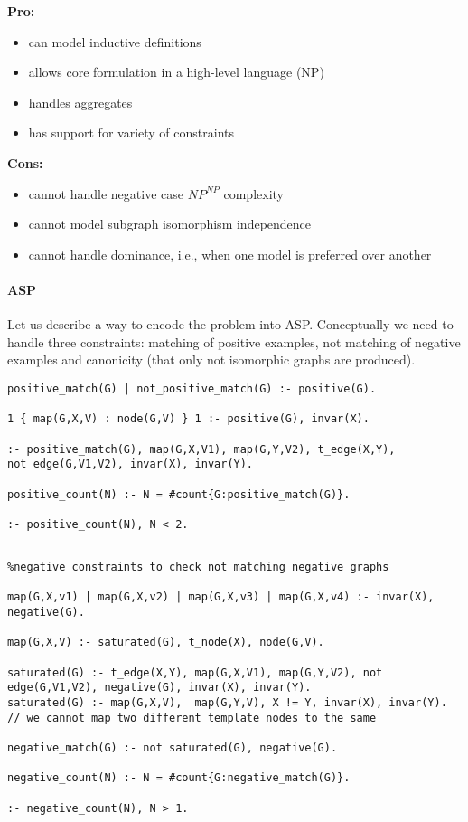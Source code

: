 \documentclass{article}
\theoremstyle{definition}
\begin{document}
\textbf{Pro:}
\begin{itemize}
  \item can model inductive definitions
  \item allows core formulation in a high-level language (NP)
  \item handles aggregates
  \item has support for variety of constraints
\end{itemize}
\textbf{Cons:}
\begin{itemize}
  \item cannot handle negative case $\textit{NP}^\textit{NP}$ complexity
  \item cannot model subgraph isomorphism independence
  \item cannot handle dominance, i.e., when one model is preferred over another 
\end{itemize}

\paragraph{ASP}
Let us describe a way to encode the problem into ASP. Conceptually we need to handle three constraints: matching of positive examples, not matching of negative examples and canonicity (that only not isomorphic graphs are produced).

\lstset{basicstyle=\footnotesize\ttfamily,breaklines=true}
\begin{lstlisting}[caption=ASP positive matching, style=model]
positive_match(G) | not_positive_match(G) :- positive(G).

1 { map(G,X,V) : node(G,V) } 1 :- positive(G), invar(X).

:- positive_match(G), map(G,X,V1), map(G,Y,V2), t_edge(X,Y), 
not edge(G,V1,V2), invar(X), invar(Y).

positive_count(N) :- N = #count{G:positive_match(G)}.

:- positive_count(N), N < 2.
\end{lstlisting}

\begin{lstlisting}[caption=ASP negative matching, style=model]
%Saturated Representation

%negative constraints to check not matching negative graphs

map(G,X,v1) | map(G,X,v2) | map(G,X,v3) | map(G,X,v4) :- invar(X), negative(G).

map(G,X,V) :- saturated(G), t_node(X), node(G,V).

saturated(G) :- t_edge(X,Y), map(G,X,V1), map(G,Y,V2), not edge(G,V1,V2), negative(G), invar(X), invar(Y).
saturated(G) :- map(G,X,V),  map(G,Y,V), X != Y, invar(X), invar(Y). // we cannot map two different template nodes to the same 

negative_match(G) :- not saturated(G), negative(G).

negative_count(N) :- N = #count{G:negative_match(G)}.

:- negative_count(N), N > 1.

\end{lstlisting}
\end{document}
